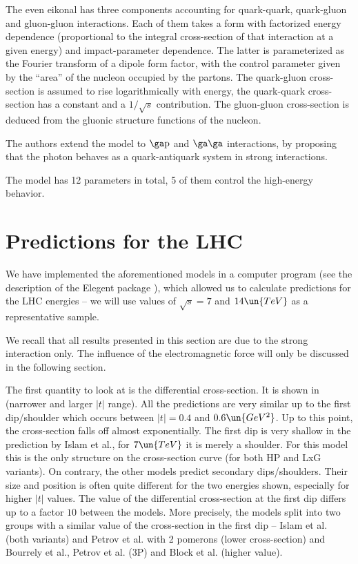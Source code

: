 The even eikonal has three components accounting for quark-quark, quark-gluon and gluon-gluon interactions. Each of them takes a form with factorized energy dependence (proportional to the integral cross-section of that interaction at a given energy) and impact-parameter dependence. The latter is parameterized as the Fourier transform of a dipole form factor, with the control parameter given by the ``area'' of the nucleon occupied by the partons. The quark-gluon cross-section is assumed to rise logarithmically with energy, the quark-quark cross-section has a constant and a $1/\sqrt s$ contribution. The gluon-gluon cross-section is deduced from the gluonic structure functions of the nucleon.

The authors extend the model to $\rm\ga p$ and $\rm\ga\ga$ interactions, by proposing that the photon behaves as a quark-antiquark system in strong interactions.

The model has 12 parameters in total, 5 of them control the high-energy behavior.

\section[el pred]{Predictions for the LHC}

We have implemented the aforementioned models in a computer program (see the description of the Elegent package ), which allowed us to calculate predictions for the LHC energies -- we will use values of $\sqrt s = 7$ and $14\un{TeV}$ as a representative sample.

We recall that all results presented in this section are due to the strong interaction only. The influence of the electromagnetic force will only be discussed in the following section.

The first quantity to look at is the differential cross-section. It is shown in  (narrower and larger $|t|$ range). All the predictions are very similar up to the first dip/shoulder which occurs between $|t| = 0.4$ and $0.6\un{GeV^2}$. Up to this point, the cross-section falls off almost exponentially. The first dip is very shallow in the prediction by Islam et al., for $7\un{TeV}$ it is merely a shoulder. For this model this is the only structure on the cross-section curve (for both HP and LxG variants). On contrary, the other models predict secondary dips/shoulders. Their size and position is often quite different for the two energies shown, especially for higher $|t|$ values. The value of the differential cross-section at the first dip differs up to a factor $10$ between the models. More precisely, the models split into two groups with a similar value of the cross-section in the first dip -- Islam et al. (both variants) and Petrov et al. with 2 pomerons (lower cross-section) and Bourrely et al., Petrov et al. (3P) and Block et al. (higher value).

